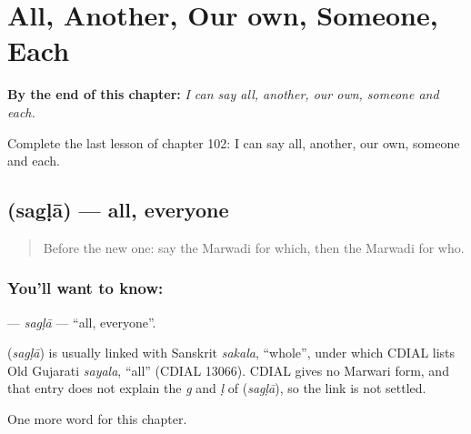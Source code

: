 
\chapter{All, Another, Our own, Someone, Each}
\label{ch:mw-all-another-our-own-someone-each}

\begin{chapteropening}
\textbf{By the end of this chapter:} \emph{I can say all, another, our own, someone and each.}

Complete the last lesson of chapter 102: I can say all, another, our own, someone and each.
\end{chapteropening}

\section[\texorpdfstring{\mw{सगळा} (sagḷā)}{सगळा (sagḷā)}]{ (sagḷā) — all, everyone}

\label{lesson:MW-C102-sagla}



\begin{quote}
Before the new one: say the Marwadi for which, then the Marwadi for who.
\end{quote}

\subsection*{You'll want to know: }
\textbf{} — \emph{sagḷā} — \textquotedblleft{}all, everyone\textquotedblright{}.

\begin{cousinweb}
\textbf{} (\emph{sagḷā}) is usually linked with Sanskrit \emph{sakala}, \textquotedblleft{}whole\textquotedblright{}, under which CDIAL lists Old Gujarati \emph{sayala}, \textquotedblleft{}all\textquotedblright{} (CDIAL 13066). CDIAL gives no Marwari form, and that entry does not explain the \emph{g} and \emph{ḷ} of \textbf{} (\emph{sagḷā}), so the link is not settled.
\end{cousinweb}

\begin{grammarlens}[title={What you've built}]
One more word for this chapter.
\end{grammarlens}

